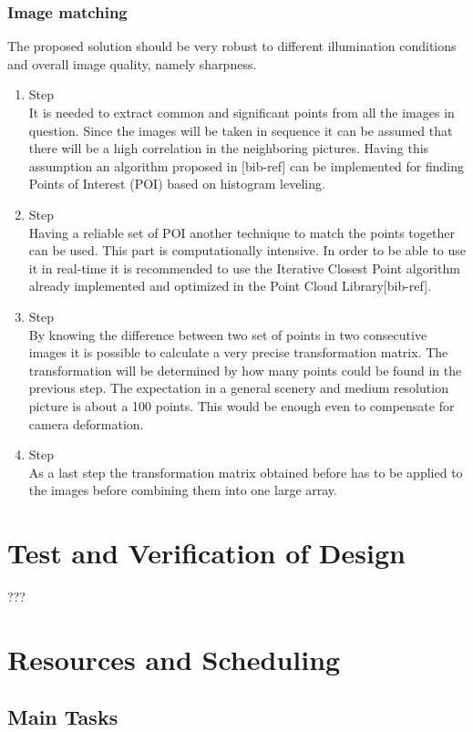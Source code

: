\documentclass[fontsize=11pt,paper=a4,]{scrartcl}
\begin{document}
\subsubsection*{Image matching}
\label{sec:algorithm}
The proposed solution should be very robust to different illumination conditions and overall image quality, namely sharpness. 
\begin{enumerate}
\item Step\\
It is needed to extract common and significant points from all the images in question. Since the images
will be taken in sequence it can be assumed that there will be a high correlation in the neighboring pictures.
Having this assumption an algorithm proposed in [bib-ref] can be implemented for finding 
Points of Interest (POI) based on histogram leveling. 
\item Step \\
Having a reliable set of POI another technique to match the points together can be used. This part is
computationally intensive. In order to be able to use it in real-time it is recommended to use the Iterative Closest Point
algorithm already implemented and optimized in the Point Cloud Library[bib-ref].
\item Step\\
By knowing the difference between two set of points in two consecutive images it is possible to calculate
a very precise transformation matrix. The transformation will be determined by how many points
could be found in the previous step. The expectation in a general scenery and medium resolution picture
is about a 100 points. This would be enough even to compensate for camera deformation.
\item Step \\
As a last step the transformation matrix obtained before has to be applied to the images before combining them into one large array. 
\end{enumerate}


\FloatBarrier
\section{Test and Verification of Design}
???


\section{Resources and Scheduling}
\subsection{Main Tasks}
\end{document}
